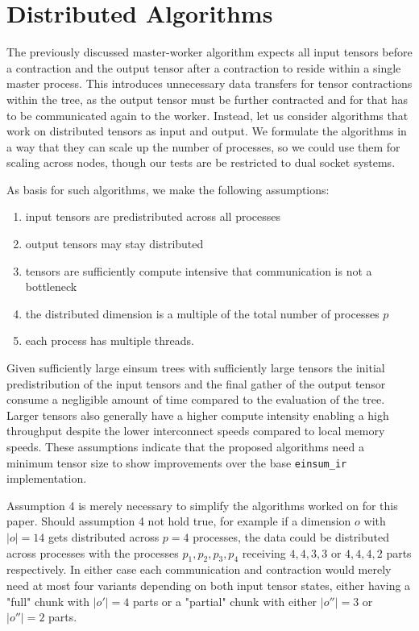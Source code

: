\section{Distributed Algorithms}
\label{sec:n_nodes}

The previously discussed master-worker algorithm expects all input tensors before a contraction and the output tensor after a contraction to reside within a single master process.
This introduces unnecessary data transfers for tensor contractions within the tree, as the output tensor must be further contracted and for that has to be communicated again to the worker.
Instead, let us consider algorithms that work on distributed tensors as input and output.
We formulate the algorithms in a way that they can scale up the number of processes, so we could use them for scaling across nodes, though our tests are be restricted to dual socket systems.

As basis for such algorithms, we make the following assumptions:
\begin{enumerate}
    \item input tensors are predistributed across all processes
    \item output tensors may stay distributed
    \item tensors are sufficiently compute intensive that communication is not a bottleneck
    \item the distributed dimension is a multiple of the total number of processes $p$
    \item each process has multiple threads.
\end{enumerate}

Given sufficiently large einsum trees with sufficiently large tensors the initial predistribution of the input tensors and the final gather of the output tensor consume a negligible amount of time compared to the evaluation of the tree.
Larger tensors also generally have a higher compute intensity enabling a high throughput despite the lower interconnect speeds compared to local memory speeds.
These assumptions indicate that the proposed algorithms need a minimum tensor size to show improvements over the base \texttt{einsum\_ir} implementation.

Assumption 4 is merely necessary to simplify the algorithms worked on for this paper.
Should assumption 4 not hold true, for example if a dimension $o$ with $|o|=14$ gets distributed across $p=4$ processes, the data could be distributed across processes with the processes $p_1,p_2,p_3,p_4$ receiving $4,4,3,3$ or $4,4,4,2$ parts respectively.
In either case each communication and contraction would merely need at most four variants depending on both input tensor states, either having a "full" chunk with $|o'|=4$ parts or a "partial" chunk with either $|o''|=3$ or $|o''|=2$ parts.

